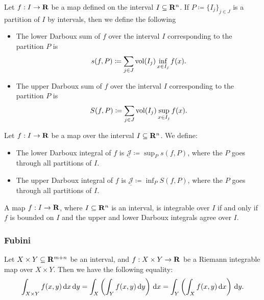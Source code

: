 \begin{definition}
\label{def:darboux-sums}
Let \(f: I \to \mathbf{R}\) be a map defined on the interval \(I \subseteq \mathbf{R}^n\). If
\(P \coloneq \{I_{j}\}_{j \in J}\) is a partition of \(I\) by intervals, then we
define the following
\begin{itemize}\setlength\itemsep{0em}
\item The lower Darboux sum of \(f\) over the interval \(I\) corresponding to
  the partition \(P\) is
  \[
    s(f, P) \coloneq \sum_{j \in J} \operatorname{vol}(I_j) \inf_{x \in I_j} f(x).
  \]
\item The upper Darboux sum of \(f\) over the interval \(I\) corresponding to
  the partition \(P\) is
  \[
    S(f, P) \coloneq \sum_{j \in J} \operatorname{vol}(I_j) \sup_{x \in I_j} f(x).
  \]
\end{itemize}
\end{definition}

\begin{definition}
\label{def:upper-lower-darboux}
Let \(f: I \to \mathbf{R}\) be a map over the interval \(I \subseteq \mathbf{R}^n\). We define:
\begin{itemize}\setlength\itemsep{0em}
\item The lower Darboux integral of \(f\) is \(\underline{\mathcal{J}} \coloneq
  \sup_P s(f, P)\), where the \(P\) goes through all partitions of \(I\).

\item The upper Darboux integral of \(f\) is \(\underline{\mathcal{J}} \coloneq
  \inf_P S(f, P)\), where the \(P\) goes through all partitions of \(I\).
\end{itemize}
\end{definition}

\begin{theorem}
\label{thm:darboux-criterion}
A map \(f: I \to \mathbf{R}\), where \(I \subseteq \mathbf{R}^n\) is an interval, is integrable
over \(I\) if and only if \(f\) is bounded on \(I\) and the upper and lower
Darboux integrals agree over \(I\).
\end{theorem}


\subsubsection{Fubini}

\begin{theorem}
\label{thm:fubini}
Let \(X \times Y \subseteq \mathbf{R}^{m + n}\) be an interval, and \(f: X \times Y \to
\mathbf{R}\) be a Riemann integrable map over \(X \times Y\). Then we have the following
equality:
\begin{equation}
\label{eq:fubini}
  \int_{X \times Y} f(x, y)\, \mathrm{d} x\, \mathrm{d} y
  = \int_X \left( \int_Y f(x, y)\, \mathrm{d} y\right)\, \mathrm{d} x
  = \int_Y \left( \int_X f(x, y)\, \mathrm{d} x\right)\, \mathrm{d} y.
\end{equation}
\end{theorem}

